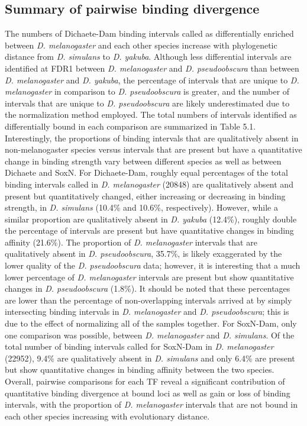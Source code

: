 \subsection{Summary of pairwise binding divergence}
The numbers of Dichaete-Dam binding intervals called as differentially enriched between \emph{D. melanogaster} and each other species increase with phylogenetic distance from \emph{D. simulans} to \emph{D. yakuba}. Although less differential intervals are identified at FDR1 between \emph{D. melanogaster} and \emph{D. pseudoobscura} than between \emph{D. melanogaster} and \emph{D. yakuba}, the percentage of intervals that are unique to \emph{D. melanogaster} in comparison to \emph{D. pseudoobscura} is greater, and the number of intervals that are unique to \emph{D. pseudoobscura} are likely underestimated due to the normalization method employed. The total numbers of intervals identified as differentially bound in each comparison are summarized in Table 5.1. Interestingly, the proportions of binding intervals that are qualitatively absent in non-melanogaster species versus intervals that are present but have a quantitative change in binding strength vary between different species as well as between Dichaete and SoxN. For Dichaete-Dam, roughly equal percentages of the total binding intervals called in \emph{D. melanogaster} (20848) are qualitatively absent and present but quantitatively changed, either increasing or decreasing in binding strength, in \emph{D. simulans} (10.4\% and 10.6\%, respectively). However, while a similar proportion are qualitatively absent in \emph{D. yakuba} (12.4\%), roughly double the percentage of intervals are present but have quantitative changes in binding affinity (21.6\%). The proportion of \emph{D. melanogaster} intervals that are qualitatively absent in \emph{D. pseudoobscura}, 35.7\%, is likely exaggerated by the lower quality of the \emph{D. pseudoobscura} data; however, it is interesting that a much lower percentage of \emph{D. melanogaster} intervals are present but show quantitative changes in \emph{D. pseudoobscura} (1.8\%). It should be noted that these percentages are lower than the percentage of non-overlapping intervals arrived at by simply intersecting binding intervals in \emph{D. melanogaster} and \emph{D. pseudoobscura}; this is due to the effect of normalizing all of the samples together. For SoxN-Dam, only one comparison was possible, between \emph{D. melanogaster} and \emph{D. simulans}. Of the total number of binding intervals called for SoxN-Dam in \emph{D. melanogaster} (22952), 9.4\% are qualitatively absent in \emph{D. simulans} and only 6.4\% are present but show quantitative changes in binding affinity between the two species. Overall, pairwise comparisons for each TF reveal a significant contribution of quantitative binding divergence at bound loci as well as gain or loss of binding intervals, with the proportion of \emph{D. melanogaster} intervals that are not bound in each other species increasing with evolutionary distance.\\

